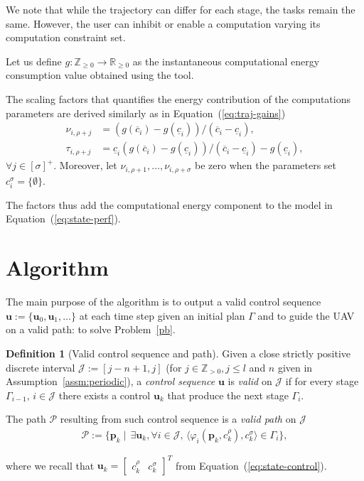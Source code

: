 \documentclass[letterpaper,10pt,conference]{ieeeconf}
\theoremstyle{definition}
\newtheorem{defn}{Definition}[section]
\begin{document}
We note that while the trajectory can differ for each stage, the tasks remain the same. However, the user can inhibit or enable a computation varying its computation constraint set.

Let us define $g:\mathbb{Z}_{\geq 0}\rightarrow\mathbb{R}_{\geq 0}$ as the instantaneous computational energy consumption value obtained using the tool.

The scaling factors that quantifies the energy contribution of the computations parameters are derived similarly as in Equation~(\ref{eq:traj-gains})
\begin{equation}\label{eq:energy-comp}\begin{split}
  \nu_{i,\rho+j}&=(g(\overline{c}_i)-g(\underline{c}_i))/(\overline{c}_i-\underline{c}_i),\\
  \tau_{i,\rho+j}&=\underline{c}_i(g(\overline{c}_i)-g(\underline{c}_i))/(\overline{c}_i-\underline{c}_i)-g(\underline{c}_i),
\end{split}\end{equation}
$\forall j\in[\sigma]^+$. Moreover, let $\nu_{i,\rho+1},\dots,\nu_{i,\rho+\sigma}$ be zero when the parameters set $c_i^\sigma=\{\emptyset\}$.

The factors thus add the computational energy component to the model in Equation~(\ref{eq:state-perf}).


\section{Algorithm}
\label{sec:algo}

The main purpose of the algorithm is to output a valid control sequence $\mathbf{u}:=\{\mathbf{u}_0,\mathbf{u}_1,\dots\}$ at each time step given an initial plan $\Gamma$ and to guide the UAV on a valid path: to solve Problem~\ref{pb}.

\begin{defn}[Valid control sequence and path]\label{def:valid}
  Given a close strictly positive discrete interval $\mathcal{J}:=[j-n+1,j]$ (for $j\in\mathbb{Z}_{>0},j\leq l$ and $n$ given in Assumption~\ref{assm:periodic}), a \emph{control sequence} $\mathbf{u}$ is \emph{valid} on $\mathcal{J}$ if for every stage $\Gamma_{i-1},\,i\in\mathcal{J}$ there exists a control $\mathbf{u}_k$ that produce the next stage $\Gamma_i$. 
  
  The path $\mathcal{P}$ resulting from such control sequence is a \emph{valid path} on $\mathcal{J}$
  \begin{equation*}\begin{split}\label{eq:mission-valid}
   \mathcal{P}:=\{\mathbf{p}_{k}\mid\,\exists \mathbf{u}_k,\forall i\in\mathcal{J},\,\langle\varphi_i(\mathbf{p}_{k},c_{k}^\rho),c_{k}^\sigma\rangle\in\Gamma_i\},
  \end{split}\end{equation*}
\end{defn}
where we recall that $\mathbf{u}_k=\begin{bmatrix}c_k^\rho & c_k^\sigma\end{bmatrix}^T$ from Equation~(\ref{eq:state-control}).
\end{document}
